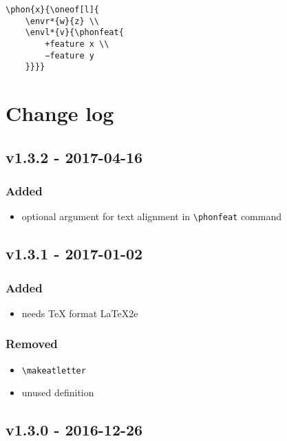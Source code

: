 \documentclass[a4paper]{article}
\begin{document}
\begin{exe}
\ex
\begin{lstlisting}
\phon{x}{\oneof[l]{
    \envr*{w}{z} \\
    \envl*{v}{\phonfeat{
        +feature x \\
        −feature y
    }}}}
\end{lstlisting}
\ex {}
\end{exe}

\section{Change log}

\subsection*{v1.3.2 - 2017-04-16}
\subsubsection*{Added}
\begin{itemize}
    \item optional argument for text alignment in \verb+\phonfeat+ command
\end{itemize}

\subsection*{v1.3.1 - 2017-01-02}
\subsubsection*{Added}
\begin{itemize}
    \item needs \TeX{} format \LaTeX2e
\end{itemize}
\subsubsection*{Removed}
\begin{itemize}
    \item \verb+\makeatletter+
    \item unused definition
\end{itemize}

\subsection*{v1.3.0 - 2016-12-26}
\end{document}
